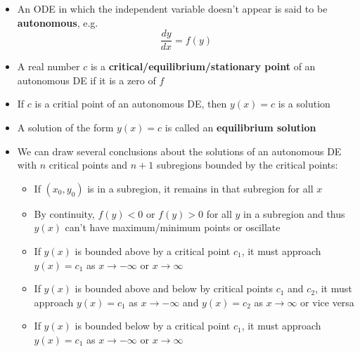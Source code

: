 \documentclass{article}
\begin{document}
\begin{itemize}
  \item An ODE in which the independent variable doesn't appear is said to be \textbf{autonomous}, e.g. \[\frac{d y}{d x} = f(y)\]

  \item A real number $c$ is a \textbf{critical/equilibrium/stationary point} of an autonomous DE if it is a zero of $f$

  \item If $c$ is a critial point of an autonomous DE, then $y(x) = c$ is a solution

  \item A solution of the form $y(x) = c$ is called an \textbf{equilibrium solution}

  \item We can draw several conclusions about the solutions of an autonomous DE with $n$ critical points and $n + 1$ subregions bounded by the critical points:

        \begin{itemize}
          \item If $(x_0, y_0)$ is in a subregion, it remains in that subregion for all $x$

          \item By continuity, $f(y) < 0$ or $f(y) > 0$ for all $y$ in a subregion and thus $y(x)$ can't have maximum/minimum points or oscillate

          \item If $y(x)$ is bounded above by a critical point $c_1$, it must approach $y(x) = c_1$ as $x \rightarrow -\infty$ or $x \rightarrow \infty$

          \item If $y(x)$ is bounded above and below by critical points $c_1$ and $c_2$, it must approach $y(x) = c_1$ as $x \rightarrow -\infty$ and $y(x) = c_2$ as $x \rightarrow \infty$ or vice versa

          \item If $y(x)$ is bounded below by a critical point $c_1$, it must approach $y(x) = c_1$ as $x \rightarrow -\infty$ or $x \rightarrow \infty$
        \end{itemize}
\end{itemize}
\end{document}

